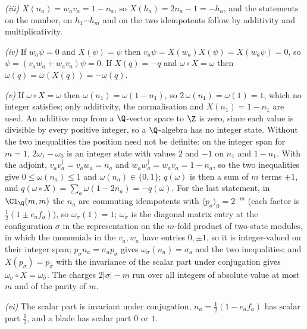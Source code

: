 \emph{(iii)} $X(n_{a}) = w_{a}v_{a} = 1 - n_{a}$, so $X(h_{a}) = 2n_{a} - 1 = -h_{a}$, and the statements on the number, on $h_{1}\cdots h_{m}$ and on the two idempotents follow by additivity and multiplicativity.

\emph{(iv)} If $w_{a}\psi = 0$ and $X(\psi) = \psi$ then $v_{a}\psi = X(w_{a})X(\psi) = X(w_{a}\psi) = 0$, so $\psi = (v_{a}w_{a} + w_{a}v_{a})\psi = 0$. If $X(q) = -q$ and $\omega \circ X = \omega$ then $\omega(q) = \omega(X(q)) = -\omega(q)$.

\emph{(v)} If $\omega \circ X = \omega$ then $\omega(n_{1}) = \omega(1 - n_{1})$, so $2\,\omega(n_{1}) = \omega(1) = 1$, which no integer satisfies; only additivity, the normalisation and $X(n_{1}) = 1 - n_{1}$ are used. An additive map from a $\Q$-vector space to $\Z$ is zero, since each value is divisible by every positive integer, so a $\Q$-algebra has no integer state. Without the two inequalities the position need not be definite: on the integer span for $m = 1$, $2\omega_{1} - \omega_{0}$ is an integer state with values $2$ and $-1$ on $n_{1}$ and $1 - n_{1}$. With the adjoint, $v_{a}v_{a}^{\dagger} = v_{a}w_{a} = n_{a}$ and $w_{a}w_{a}^{\dagger} = w_{a}v_{a} = 1 - n_{a}$, so the two inequalities give $0 \le \omega(n_{a}) \le 1$ and $\omega(n_{a}) \in \{0, 1\}$; $q(\omega)$ is then a sum of $m$ terms $\pm 1$, and $q(\omega \circ X) = \sum_{a}\omega(1 - 2n_{a}) = -q(\omega)$. For the last statement, in $\Cl_{\Q}(m,m)$ the $n_{a}$ are commuting idempotents with $\langle p_{\sigma}\rangle_{0} = 2^{-m}$ (each factor is $\tfrac12(1 \pm e_{a}f_{a})$), so $\omega_{\sigma}(1) = 1$; $\omega_{\sigma}$ is the diagonal matrix entry at the configuration $\sigma$ in the representation on the $m$-fold product of two-state modules, in which the monomials in the $v_{a}, w_{a}$ have entries $0, \pm 1$, so it is integer-valued on their integer span; $p_{\sigma}n_{a} = \sigma_{a}p_{\sigma}$ gives $\omega_{\sigma}(n_{a}) = \sigma_{a}$ and the two inequalities; and $X(p_{\sigma}) = p_{\bar\sigma}$ with the invariance of the scalar part under conjugation gives $\omega_{\sigma} \circ X = \omega_{\bar\sigma}$. The charges $2|\sigma| - m$ run over all integers of absolute value at most $m$ and of the parity of $m$.

\emph{(vi)} The scalar part is invariant under conjugation, $n_{a} = \tfrac12(1 - e_{a}f_{a})$ has scalar part $\tfrac12$, and a blade has scalar part $0$ or $1$.
